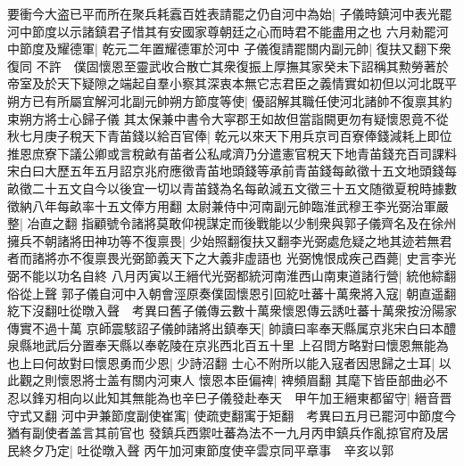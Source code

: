 要衝今大盗已平而所在聚兵耗蠧百姓表請罷之仍自河中為始|{
	子儀時鎮河中表光罷河中節度以示諸鎮君子惜其有安國家尊朝廷之心而時君不能盡用之也}
六月勑罷河中節度及耀德軍|{
	乾元二年置耀德軍於河中}
子儀復請罷關内副元帥|{
	復扶又翻下衆復同}
不許　僕固懷恩至靈武收合散亡其衆復振上厚撫其家癸未下詔稱其勲勞著於帝室及於天下疑隙之端起自羣小察其深衷本無它志君臣之義情實如初但以河北既平朔方已有所屬宜解河北副元帥朔方節度等使|{
	優詔解其職任使河北諸帥不復禀其約束朔方將士心歸子儀}
其太保兼中書令大寜郡王如故但當詣闕更勿有疑懷恩竟不從　秋七月庚子稅天下青苖錢以給百官俸|{
	乾元以來天下用兵京司百寮俸錢減耗上即位推恩庶寮下議公卿或言稅畝有苖者公私咸濟乃分遣憲官稅天下地青苖錢充百司課料宋白曰大歷五年五月詔京兆府應徵青苖地頭錢等承前青苖錢每畝徵十五文地頭錢每畝徵二十五文自今以後宜一切以青苖錢為名每畝減五文徵三十五文随徵夏稅時據數徵納八年每畝率十五文俸方用翻}
太尉兼侍中河南副元帥臨淮武穆王李光弼治軍嚴整|{
	冶直之翻}
指顧號令諸將莫敢仰視謀定而後戰能以少制衆與郭子儀齊名及在徐州擁兵不朝諸將田神功等不復禀畏|{
	少始照翻復扶又翻李光弼處危疑之地其迹若無君者而諸將亦不復禀畏光弼節義天下之大義非虚語也}
光弼愧恨成疾己酉薨|{
	史言李光弼不能以功名自終}
八月丙寅以王縉代光弼都統河南淮西山南東道諸行營|{
	統他綜翻俗從上聲}
郭子儀自河中入朝會涇原奏僕固懷恩引回紇吐蕃十萬衆將入寇|{
	朝直遥翻紇下沒翻吐從暾入聲　考異曰舊子儀傳云數十萬衆懷恩傳云誘吐蕃十萬衆按汾陽家傳實不過十萬}
京師震駭詔子儀帥諸將出鎮奉天|{
	帥讀曰率奉天縣属京兆宋白曰本醴泉縣地武后分置奉天縣以奉乾陵在京兆西北百五十里}
上召問方略對曰懷恩無能為也上曰何故對曰懷恩勇而少恩|{
	少詩沼翻}
士心不附所以能入寇者因思歸之士耳|{
	以此觀之則懷恩將士盖有關内河東人}
懷恩本臣偏禆|{
	禆頻眉翻}
其麾下皆臣部曲必不忍以鋒刃相向以此知其無能為也辛巳子儀發赴奉天　甲午加王縉東都留守|{
	縉音晋守式又翻}
河中尹兼節度副使崔㝢|{
	使疏吏翻㝢于矩翻　考異曰五月已罷河中節度今猶有副使者盖言其前官也}
發鎮兵西禦吐蕃為法不一九月丙申鎮兵作亂掠官府及居民終夕乃定|{
	吐從暾入聲}
丙午加河東節度使辛雲京同平章事　辛亥以郭

